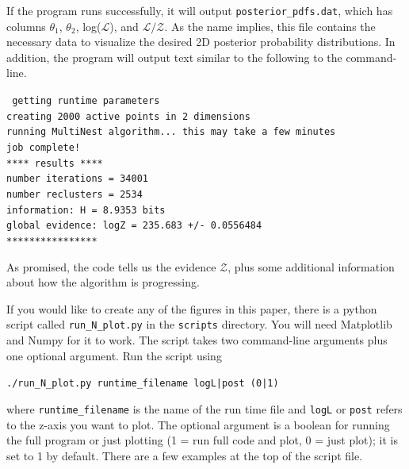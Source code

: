 \documentclass{article}
\begin{document}
If the program runs successfully, it will output {\tt posterior\_pdfs.dat}, which has columns  $\theta_1$, $\theta_2$, log($\mathcal{L}$), and $\mathcal{L/Z}$. As the name implies, this file contains the necessary data to visualize the desired 2D posterior probability distributions. In addition, the program will output text similar to the following to the command-line. 

\begin{adjustwidth*}{1.2cm}{1.2cm}
{\tt
getting runtime parameters\\
creating 2000 active points in 2 dimensions\\
running MultiNest algorithm... this may take a few minutes\\
job complete!\\
**** results ****\\
number iterations = 34001\\
number reclusters = 2534\\
information: H =  8.9353 bits\\
global evidence: logZ = 235.683 +/- 0.0556484\\
****************}
\end{adjustwidth*}

As promised, the code tells us the evidence $\mathcal{Z}$, plus some additional information about how the algorithm is progressing. 

If you would like to create any of the figures in this paper, there is a python script called {\tt run\_N\_plot.py} in the {\tt scripts} directory. You will need Matplotlib and Numpy for it to work. The script takes two command-line arguments plus one optional argument. Run the script using 

\vspace{0.2cm}

\begin{adjustwidth*}{2cm}{2cm}
{\tt ./run\_N\_plot.py runtime\_filename logL|post (0|1)}
\end{adjustwidth*}

\vspace{0.2cm}

\noindent where {\tt runtime\_filename} is the name of the run time file and {\tt logL} or {\tt post} refers to the z-axis you want to plot. The optional argument is a boolean for running the full program or just plotting (1 = run full code and plot, 0 = just plot); it is set to 1 by default. There are a few examples at the top of the script file. 

\vspace{-0.3cm}



\end{document}
